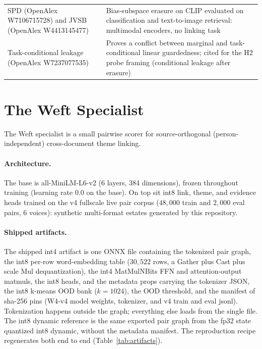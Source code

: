 \documentclass{article}
\begin{document}
\begin{table}[t]
\begin{center}
{\begin{tabular}{p{5.1in}p{3.6in}}
SPD (OpenAlex W7106715728) \citep{spd2025} and JVSB (OpenAlex W4413145477) \citep{jvsb2025} & Bias-subspace erasure on CLIP evaluated on classification and text-to-image retrieval: multimodal encoders, no linking task \\
Task-conditional leakage (OpenAlex W7237077535) \citep{taskconditional2026} & Proves a conflict between marginal and task-conditional linear guardedness; cited for the H2 probe framing (conditional leakage after erasure) \\
\bottomrule
\end{tabular}%
}
\end{center}
\vskip -0.14in
\end{table}

\section{The Weft Specialist}
\label{sec:specialist}

The Weft specialist is a small pairwise scorer for source-orthogonal (person-independent) cross-document theme linking.

\paragraph{Architecture.}
The base is all-MiniLM-L6-v2 (6 layers, 384 dimensions), frozen throughout training (learning rate $0.0$ on the base). On top sit int8 link, theme, and evidence heads trained on the v4 fullscale live pair corpus ($48{,}000$ train and $2{,}000$ eval pairs, $6$ voices): synthetic multi-format estates generated by this repository.

\paragraph{Shipped artifacts.}
The shipped int4 artifact is one ONNX file containing the tokenized pair graph, the int8 per-row word-embedding table ($30{,}522$ rows, a Gather plus Cast plus scale Mul dequantization), the int4 MatMulNBits FFN and attention-output matmuls, the int8 heads, and the metadata props carrying the tokenizer JSON, the int8 k-means OOD bank ($k{=}1024$), the OOD threshold, and the manifest of sha-256 pins (W4-v4 model weights, tokenizer, and v4 train and eval jsonl). Tokenization happens outside the graph; everything else loads from the single file. The int8 dynamic reference is the same exported pair graph from the fp32 state quantized int8 dynamic, without the metadata manifest. The reproduction recipe regenerates both end to end (Table~\ref{tab:artifacts}).
\end{document}
